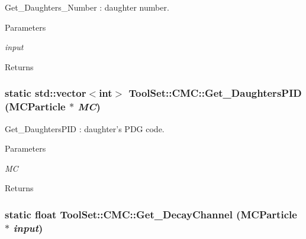 Get\_\-Daughters\_\-Number : daughter number. 
\begin{DoxyParams}{Parameters}
\item[{\em input}]\end{DoxyParams}
\begin{DoxyReturn}{Returns}

\end{DoxyReturn}
\hypertarget{classToolSet_1_1CMC_ae0aeb5054574c5c8ffd3f24e86d662a6}{
\subsubsection[{Get\_\-DaughtersPID}]{\setlength{\rightskip}{0pt plus 5cm}static std::vector$<$int$>$ ToolSet::CMC::Get\_\-DaughtersPID (MCParticle $\ast$ {\em MC})}}
\label{classToolSet_1_1CMC_ae0aeb5054574c5c8ffd3f24e86d662a6}


Get\_\-DaughtersPID : daughter's PDG code. 
\begin{DoxyParams}{Parameters}
\item[{\em MC}]\end{DoxyParams}
\begin{DoxyReturn}{Returns}

\end{DoxyReturn}
\hypertarget{classToolSet_1_1CMC_aa16a7d3c1cbd3e1d25cf885b25d561ec}{
\subsubsection[{Get\_\-DecayChannel}]{\setlength{\rightskip}{0pt plus 5cm}static float ToolSet::CMC::Get\_\-DecayChannel (MCParticle $\ast$ {\em input})}}
\label{classToolSet_1_1CMC_aa16a7d3c1cbd3e1d25cf885b25d561ec}



